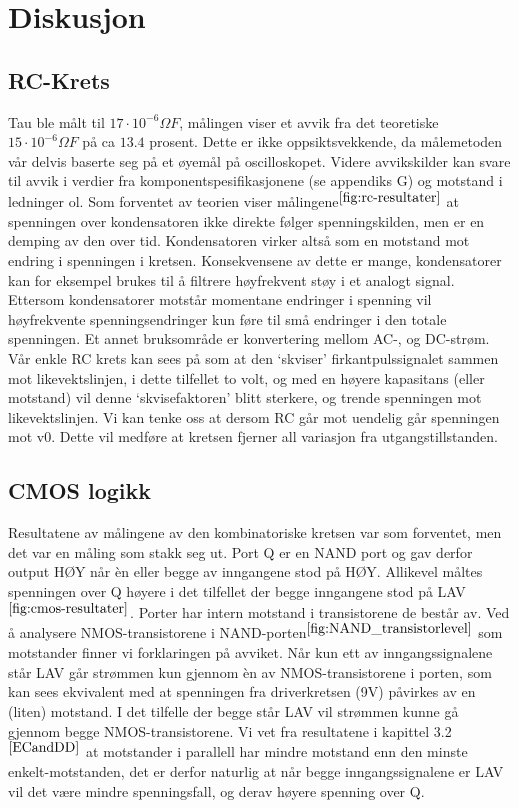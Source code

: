 \section{Diskusjon}

\subsection{RC-Krets}

    Tau ble målt til $17 \cdot 10^{-6} \Omega F$, målingen viser et avvik fra det teoretiske $15 \cdot 10^{-6} \Omega F$ på ca $13.4$ prosent.
    Dette er ikke oppsiktsvekkende, da målemetoden vår delvis baserte seg på et øyemål på oscilloskopet.
    Videre avvikskilder kan svare til avvik i verdier fra komponentspesifikasjonene (se appendiks G) og motstand i ledninger ol.
    Som forventet av teorien viser målingene$^{\ref{fig:rc-resultater}}$ at spenningen over kondensatoren ikke direkte følger spenningskilden, men er en demping av den over tid.
    Kondensatoren virker altså som en motstand mot endring i spenningen i kretsen.
    Konsekvensene av dette er mange, kondensatorer kan for eksempel brukes til å filtrere høyfrekvent støy i et analogt signal.
    Ettersom kondensatorer motstår momentane endringer i spenning vil høyfrekvente spenningsendringer kun føre til små endringer i den totale spenningen.
    Et annet bruksområde er konvertering mellom AC-, og DC-strøm.
    Vår enkle RC krets kan sees på som at den ‘skviser’ firkantpulssignalet sammen mot likevektslinjen, i dette tilfellet to volt, og med en høyere kapasitans (eller motstand) vil denne ‘skvisefaktoren’ blitt sterkere, og trende spenningen mot likevektslinjen.
    Vi kan tenke oss at dersom RC går mot uendelig går spenningen mot v0. Dette vil medføre at kretsen fjerner all variasjon fra utgangstillstanden.

\subsection{CMOS logikk}

    Resultatene av målingene av den kombinatoriske kretsen var som forventet, men det var en måling som stakk seg ut.
    Port Q er en NAND port og gav derfor output HØY når èn eller begge av inngangene stod på HØY.
    Allikevel måltes spenningen over Q høyere i det tilfellet der begge inngangene stod på LAV$^{\ref{fig:cmos-resultater}}$.
    Porter har intern motstand i transistorene de består av.
    Ved å analysere NMOS-transistorene i NAND-porten$^{\ref{fig:NAND_transistorlevel}}$ som motstander finner vi forklaringen på avviket.
    Når kun ett av inngangssignalene står LAV går strømmen kun gjennom èn av NMOS-transistorene i porten, som kan sees ekvivalent med at spenningen fra driverkretsen (9V) påvirkes av en (liten) motstand.
    I det tilfelle der begge står LAV vil strømmen kunne gå gjennom begge NMOS-transistorene.
    Vi vet fra resultatene i kapittel 3.2$^{\ref{ECandDD}}$ at motstander i parallell har mindre motstand enn den minste enkelt-motstanden, det er derfor naturlig at når begge inngangssignalene er LAV vil det være mindre spenningsfall, og derav høyere spenning over Q.

